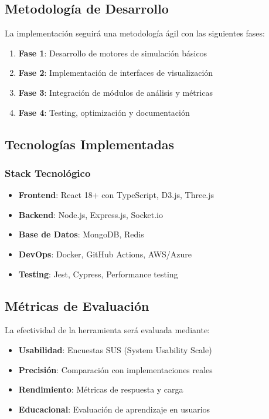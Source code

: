 \documentclass[spanish,12pt,letterpaper]{report}
\begin{document}
\subsection{Metodología de Desarrollo}

La implementación seguirá una metodología ágil con las siguientes fases:

\begin{enumerate}
    \item \textbf{Fase 1}: Desarrollo de motores de simulación básicos
    \item \textbf{Fase 2}: Implementación de interfaces de visualización
    \item \textbf{Fase 3}: Integración de módulos de análisis y métricas
    \item \textbf{Fase 4}: Testing, optimización y documentación
\end{enumerate}

\subsection{Tecnologías Implementadas}

\subsubsection{Stack Tecnológico}

\begin{itemize}
    \item \textbf{Frontend}: React 18+ con TypeScript, D3.js, Three.js
    \item \textbf{Backend}: Node.js, Express.js, Socket.io
    \item \textbf{Base de Datos}: MongoDB, Redis
    \item \textbf{DevOps}: Docker, GitHub Actions, AWS/Azure
    \item \textbf{Testing}: Jest, Cypress, Performance testing
\end{itemize}

\subsection{Métricas de Evaluación}

La efectividad de la herramienta será evaluada mediante:

\begin{itemize}
    \item \textbf{Usabilidad}: Encuestas SUS (System Usability Scale)
    \item \textbf{Precisión}: Comparación con implementaciones reales
    \item \textbf{Rendimiento}: Métricas de respuesta y carga
    \item \textbf{Educacional}: Evaluación de aprendizaje en usuarios
\end{itemize}
\end{document}
